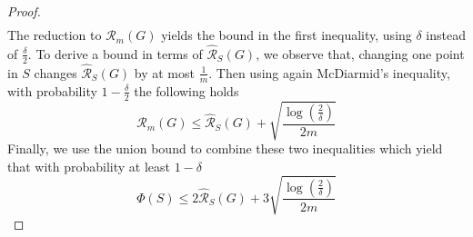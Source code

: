 \begin{proof}
\begin{align}
	\end{align}
	The reduction to $\mathcal{R}_m(G)$ yields the bound in the first inequality, using $\delta$ instead of $\frac{\delta}{2}$. To derive a bound in terms of $\hat{\mathcal{R}}_S(G)$, we observe that, changing one point in $S$ changes $\hat{\mathcal{R}}_S(G)$ by at most $\frac{1}{m}$. Then
	using again McDiarmid's inequality, with probability $1-\frac{\delta}{2}$ the following holds
	\begin{equation}
	\mathcal{R}_m(G)\leq \hat{\mathcal{R}}_S(G) +\sqrt{\frac{\log(\frac{2}{\delta})}{2m}}
	\end{equation}
	Finally, we use the union bound to combine these two inequalities which yield that
	with probability at least $1-\delta$
	\begin{equation}
	\Phi(S) \leq 2\hat{\mathcal{R}}_S(G)+3\sqrt{\frac{\log(\frac{2}{\delta})}{2m}}
	\end{equation}
\end{proof}

